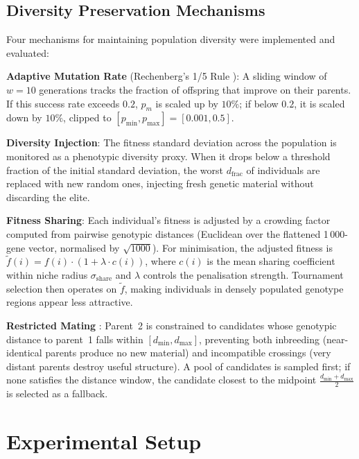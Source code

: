 \documentclass[11pt,a4paper]{article}
\begin{document}
\subsection{Diversity Preservation Mechanisms}
Four mechanisms for maintaining population diversity were
implemented and evaluated:
\vspace{0.2cm}

\textbf{Adaptive Mutation Rate} (Rechenberg's 1/5 Rule
\cite{rechenberg1973}): A sliding window
of $w=10$ generations tracks the fraction of offspring that improve on their
parents. If this success rate exceeds $0.2$, $p_m$ is scaled up by $10\%$;
if below $0.2$, it is scaled down by $10\%$, clipped to
$[p_{\min}, p_{\max}]=[0.001, 0.5]$.
\vspace{0.2cm}

\textbf{Diversity Injection}: The fitness standard deviation across the
population is monitored as a phenotypic diversity proxy. When it drops below
a threshold fraction of the initial standard deviation, the worst
$d_{\text{frac}}$ of individuals are replaced with new random ones, injecting
fresh genetic material without discarding the elite.
\vspace{0.2cm}

\textbf{Fitness Sharing}: Each individual's fitness is adjusted by a crowding
factor computed from pairwise genotypic distances (Euclidean over the
flattened 1\,000-gene vector, normalised by $\sqrt{1000}$). For minimisation,
the adjusted fitness is $\tilde{f}(i) = f(i)\cdot(1 + \lambda \cdot
c(i))$, where $c(i)$ is the mean sharing coefficient within niche radius
$\sigma_{\text{share}}$ and $\lambda$ controls the penalisation strength.
Tournament selection then operates on $\tilde{f}$, making individuals in
densely populated genotype regions appear less attractive.
\vspace{0.2cm}

\textbf{Restricted Mating} \cite{goldberg1989, eshelman1991}: Parent~2 is
constrained to candidates whose genotypic distance to parent~1 falls within
$[d_{\min}, d_{\max}]$, preventing both inbreeding (near-identical parents
produce no new material) and incompatible crossings (very distant parents
destroy useful structure). A pool of candidates is sampled first; if none
satisfies the distance window, the candidate closest to the midpoint
$\tfrac{d_{\min}+d_{\max}}{2}$ is selected as a fallback.


\section{Experimental Setup}
\end{document}
